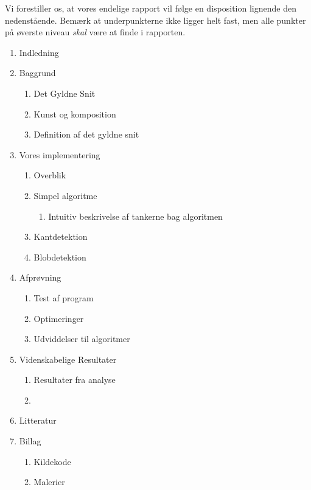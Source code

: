 Vi forestiller os, at vores endelige rapport vil følge en disposition lignende
den nedenstående. Bemærk at underpunkterne ikke ligger helt fast, men alle
punkter på øverste niveau \emph{skal} være at finde i rapporten.

\begin{enumerate}
	\item Indledning
	\item Baggrund
		\begin{enumerate}
			\item Det Gyldne Snit
			\item Kunst og komposition
			\item Definition af det gyldne snit
		\end{enumerate}
	\item Vores implementering
		\begin{enumerate}
			\item Overblik
			\item Simpel algoritme
				\begin{enumerate}
					\item Intuitiv beskrivelse af tankerne bag algoritmen
				\end{enumerate}
			\item Kantdetektion
			\item Blobdetektion
		\end{enumerate}
	\item Afprøvning
		\begin{enumerate}
			\item Test af program
			\item Optimeringer
			\item Udviddelser til algoritmer
		\end{enumerate}
	\item Videnskabelige Resultater
		\begin{enumerate}
			\item Resultater fra analyse
			\item 
		\end{enumerate}
	\item Litteratur
	\item Billag
		\begin{enumerate}
			\item Kildekode
			\item Malerier
		\end{enumerate}
\end{enumerate}
